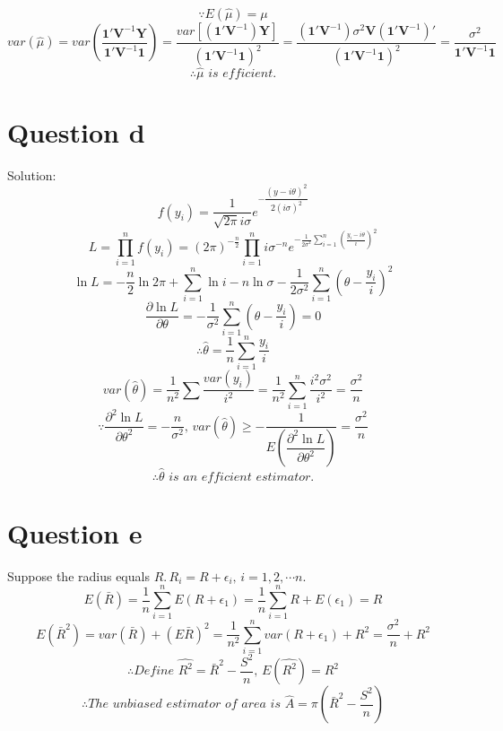 \documentclass[a4papers]{ctexart}
\begin{document}
\[\because E\left( \hat {\mu }\right) =\mu \]
\[var\left( \hat {\mu }\right) 
=var\left( \dfrac {\boldsymbol{1}'\boldsymbol{V}^{-1}\boldsymbol{Y}}{\boldsymbol{1}'\boldsymbol{V}^{-1}\boldsymbol{1}}\right) 
=\dfrac {var\left[ \left( \boldsymbol{1}'\boldsymbol{V}^{-1}\right) \boldsymbol{Y}\right] }{\left( \boldsymbol{1}'\boldsymbol{V}^{-1}\boldsymbol{1}\right) ^{2}}
=\dfrac {\left( \boldsymbol{1}'\boldsymbol{V}^{-1}\right) \sigma ^{2}\boldsymbol{V}\left( \boldsymbol{1}'\boldsymbol{V}^{-1}\right)'}{\left( \boldsymbol{1}'\boldsymbol{V}^{-1}\boldsymbol{1}\right) ^{2}}
=\dfrac {\sigma ^{2}}{\boldsymbol{1}'\boldsymbol{V}^{-1}\boldsymbol{1}}
\]
\[\therefore \hat{\mu}\,\,is\,\,efficient.\]

\section*{Question d}
\noindent Solution:
\[ f\left( y_{i}\right) =\dfrac {1}{\sqrt {2\pi }i\sigma }e^{-\dfrac {\left( y-i\theta \right) ^{2}}{2\left( i\sigma \right) ^{2}}}\]
\[ L=\prod ^{n}_{i=1}f\left( y_{i}\right) =\left( 2\pi \right) ^{-\frac {n}{2}}\prod ^{n}_{i=1}i\sigma ^{-n}e^{-\frac {1}{2\sigma^2}\sum ^{n}_{i=1}\left( \frac {y_{i}-i\theta }{i}\right) ^{2}}\]
\[ \ln L=-\dfrac {n}{2}\ln 2\pi +\sum ^{n}_{i=1}\ln i-n\ln \sigma -\dfrac {1}{2\sigma ^{2}}\sum ^{n}_{i=1}\left( \theta -\dfrac {y_{i}}{i}\right) ^{2} \]
\[ \dfrac {\partial \ln L}{\partial \theta }=-\dfrac {1}{\sigma ^{2}}\sum ^{n}_{i=1}\left( \theta -\dfrac {y_{i}}{i}\right) =0\]
\[\therefore \hat {\theta }=\dfrac {1}{n}\sum ^{n}_{i=1}\dfrac {y_{i}}{i}\]
\[ var\left( \hat {\theta }\right) =\dfrac {1}{n^{2}}\sum \dfrac {var\left( y_{i}\right) }{i^{2}}=\dfrac {1}{n^{2}}\sum ^{n}_{i=1}\dfrac {i^{2}\sigma ^{2}}{i^{2}}=\dfrac{\sigma ^{2}}{n} \]
\[ \because \dfrac {\partial ^{2}\ln L}{\partial \theta ^{2}}=-\dfrac {n}{\sigma ^{2}},\, var\left( \hat {\theta }\right) \geq -\dfrac {1}{E\left( \dfrac {\partial ^{2}\ln L}{\partial \theta ^{2}}\right) }=\dfrac {\sigma ^{2}}{n}\]
\[ \therefore \hat{\theta}\,\, is\,\, an\,\, efficient\,\, estimator.\]


\section*{Question e}
Suppose the radius equals $R$.\,$R_i = R+\epsilon_i,\,i=1,2,\cdots n.$
\[ E(\bar{R}) =\dfrac{1}{n}\sum_{i=1}^n E(R+\epsilon_1) = \dfrac{1}{n}\sum_{i=1}^n R+E(\epsilon_1) = R\]
\[ E(\bar{R}^2) = var(\bar{R})+(E\bar{R})^2 = \dfrac{1}{n^2}\sum_{i=1}^n var(R+\epsilon_1) + R^2 =\dfrac{\sigma^2}{n}+R^2\] 
\[ \therefore Define\,\,\hat{R^2} = \bar{R}^2-\dfrac{S^2}{n},\,E(\hat{R^2})=R^2 \]
\[\therefore The \,\, unbiased \,\, estimator\,\,  of\,\,  area\,\,  is \,\, \hat{A} = \pi\left(\bar{R}^2-\dfrac{S^2}{n}\right)\]
\end{document}
